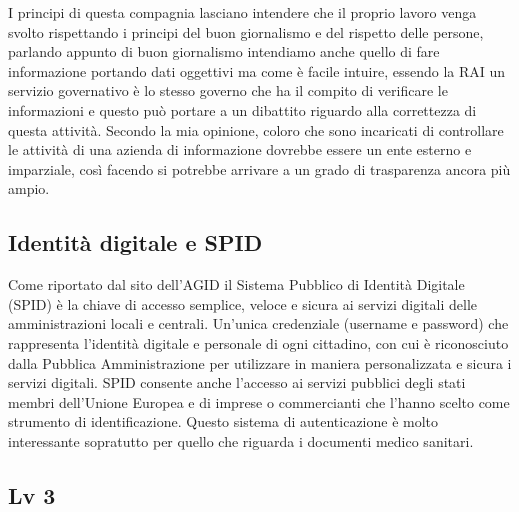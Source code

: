\documentclass{article}
\begin{document}
I principi di questa compagnia lasciano intendere che il proprio lavoro venga svolto rispettando i principi del buon giornalismo e del rispetto delle persone, parlando appunto di buon giornalismo intendiamo anche quello di fare informazione portando dati oggettivi ma come è facile intuire, essendo la RAI un servizio governativo è lo stesso governo che ha il compito di verificare le informazioni e questo può portare a un dibattito riguardo alla correttezza di questa attività.
Secondo la mia opinione, coloro che sono incaricati di controllare le attività di una azienda di informazione dovrebbe essere un ente esterno e imparziale, così facendo si potrebbe arrivare a un grado di trasparenza ancora più ampio.
\subsection{Identità digitale e SPID}
Come riportato dal sito dell'AGID \cite{Agid-2015} il Sistema Pubblico di Identità Digitale (SPID) è la chiave di accesso semplice, veloce e sicura ai servizi digitali delle amministrazioni locali e centrali. 
Un’unica credenziale (username e password) che rappresenta l’identità digitale e personale di ogni cittadino, con cui è riconosciuto dalla Pubblica Amministrazione per utilizzare in maniera personalizzata e sicura i servizi digitali. 
SPID consente anche l’accesso ai servizi pubblici degli stati membri dell’Unione Europea e di imprese o commercianti che l’hanno scelto come strumento di identificazione.
Questo sistema di autenticazione è molto interessante sopratutto per quello che riguarda i documenti medico sanitari.
\subsection{Lv 3}
\end{document}
